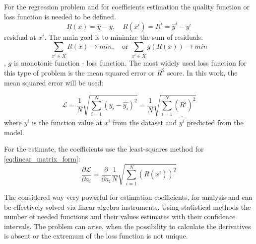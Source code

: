 For the regression problem and for coefficients estimation the quality function or loss function is needed to be defined. 
\begin{equation}
	R(x) = \hat{y} - y, \quad R(x^i) = R^i = \hat{y}^i - y^i
\end{equation}
residual at $x^i$. 
The main goal is to minimize the sum of residuals:
\begin{equation*}
	\sum_{x^i \in X} R(x) \rightarrow min, \quad \text{or }  \sum_{x^i \in X} g(R(x)) \rightarrow min
\end{equation*}
, $g$ is monotonic function - loss function.
The most widely used loss function for this type of problem is the mean squared error or $R^2$ score. In this work, the mean squared error will be used:

\begin{equation}
	\mathcal{L} = \dfrac{1}{N} \sqrt{\sum_{i = 1}^N \left ( y_i - \hat{y_i} \right )^2} = \dfrac{1}{N} \sqrt{\sum_{i = 1}^N \left ( R^i \right )^2}
	\label{eq:loss}
\end{equation}
where $y^i$ is the function value at $x^i$ from the dataset and $\hat{y^i}$ predicted from the model.

For the estimate, the coefficients use the least-squares method for \eqref{eq:linear_matrix_form}:
\begin{equation*}
	\dfrac{\partial \mathcal{L}}{\partial a_i} = \dfrac{\partial}{\partial a_i} \dfrac{1}{N} \sqrt{\sum_{i = 1}^N \left ( R(x^i) \right )^2}
\end{equation*}

The considered way very powerful for estimation coefficients, for analysis and can be effectively solved via linear algebra instruments. Using statistical methods the number of needed functions and their values estimates with their confidence intervals. The problem can arise, when the possibility to calculate the derivatives is absent or the extremum of the loss function is not unique.